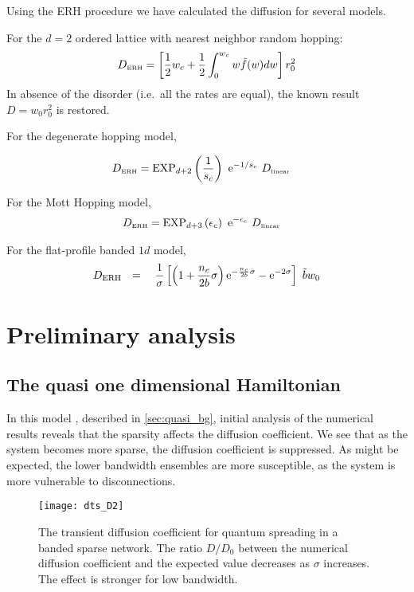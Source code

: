 Using the ERH procedure we have calculated the diffusion for several models.


For the $d=2$ ordered lattice with nearest neighbor random hopping:
%
\begin{align}
D_{\mbox{\tiny ERH}} =  \left[\frac{1}{2}w_c + \frac{1}{2}\int_0^{w_c} w\tilde{f}(w) dw\right]r_0^2
\end{align}
%
In absence of the disorder (i.e.\ all the rates are equal),
the known result $D = w_0r_0^2$ is restored.


For the degenerate hopping model, 

\begin{align}
D_{\tbox{ERH}} &=  \mathrm{EXP}_{d{+}2}\left(\frac{1}{s_c}\right)  \  \eexp{-1/s_c}  \ D_{\tbox{linear}}
\end{align}
%


For the Mott Hopping model,
%
\begin{align}
D_{\tbox{ERH}} &=\mathrm{EXP}_{d{+}3}\left(\epsilon_c\right)  \  \eexp{-\epsilon_c}  \ D_{\tbox{linear}}
\end{align}
%


For the flat-profile banded $1d$ model,
\begin{align}
D_{\text{ERH}} \ \ = \ \ 
\ \frac{1}{\sigma}\left[ 
\left(1+\frac{n_c}{2b}\sigma\right)\eexp{-\frac{n_c}{2b}\sigma} - \eexp{-2\sigma}
\right] \ \tilde{b} w_0
\end{align}

\chapter{Preliminary analysis}





\section{The quasi one dimensional Hamiltonian}


In this model , described in \autoref{sec:quasi_bg}, initial analysis of
the numerical results reveals that the sparsity affects the diffusion coefficient.
We see that as the system becomes more sparse, the diffusion coefficient is suppressed. 
As might be expected, the lower bandwidth ensembles are more
susceptible, as the system is more vulnerable to disconnections.



\begin{figure}
\texttt{[image: dts\_D2]}
\caption{The transient diffusion coefficient for quantum spreading in
a banded sparse network. The ratio $D/D_0$ between the numerical diffusion 
coefficient and the expected value decreases as $\sigma$ increases. The effect
is stronger for low bandwidth.}
\end{figure}
